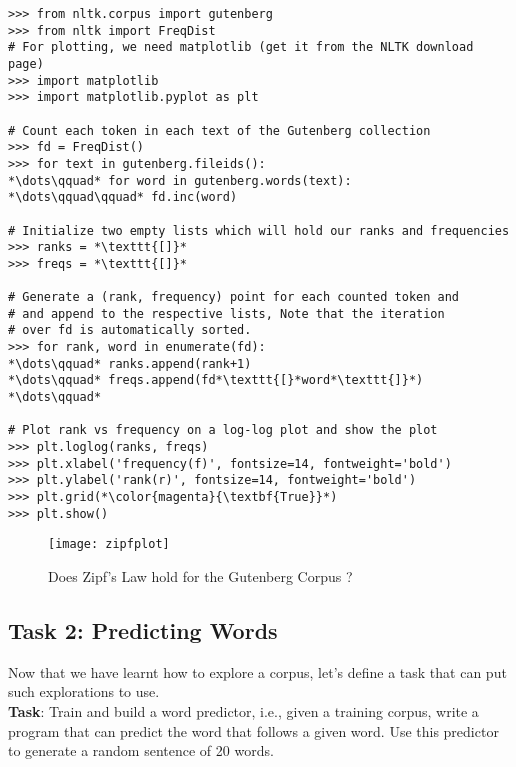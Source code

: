 \documentclass[11pt]{article}
\begin{document}
\begin{lstlisting}[float,title=Listing 1a: Using NLTK to plot Zipf's Law.,frame=trBL,escapechar=*]
>>> from nltk.corpus import gutenberg
>>> from nltk import FreqDist
# For plotting, we need matplotlib (get it from the NLTK download page)
>>> import matplotlib
>>> import matplotlib.pyplot as plt

# Count each token in each text of the Gutenberg collection
>>> fd = FreqDist()
>>> for text in gutenberg.fileids():
*\dots\qquad* for word in gutenberg.words(text):
*\dots\qquad\qquad* fd.inc(word)

# Initialize two empty lists which will hold our ranks and frequencies
>>> ranks = *\texttt{[]}*
>>> freqs = *\texttt{[]}*

# Generate a (rank, frequency) point for each counted token and
# and append to the respective lists, Note that the iteration
# over fd is automatically sorted.
>>> for rank, word in enumerate(fd):
*\dots\qquad* ranks.append(rank+1)
*\dots\qquad* freqs.append(fd*\texttt{[}*word*\texttt{]}*)
*\dots\qquad*

# Plot rank vs frequency on a log-log plot and show the plot
>>> plt.loglog(ranks, freqs)
>>> plt.xlabel('frequency(f)', fontsize=14, fontweight='bold')
>>> plt.ylabel('rank(r)', fontsize=14, fontweight='bold')
>>> plt.grid(*\color{magenta}{\textbf{True}}*)
>>> plt.show()
\end{lstlisting}

\begin{figure}[htbp]
\begin{center}
\texttt{[image: zipfplot]}
\end{center}
\caption{Does Zipf's Law hold for the Gutenberg Corpus ?}\label{zipfplot}
\end{figure}


\subsection{Task 2: Predicting Words} %
\label{sub:task_2_predicting_words}
Now that we have learnt how to explore a corpus, let's define a task that can put such explorations to use. \\

\noindent \textbf{Task}: Train and build a word predictor, i.e., given a training corpus, write a program that can predict the word that follows a given word. Use this predictor to generate a random sentence of 20 words.
\end{document}
